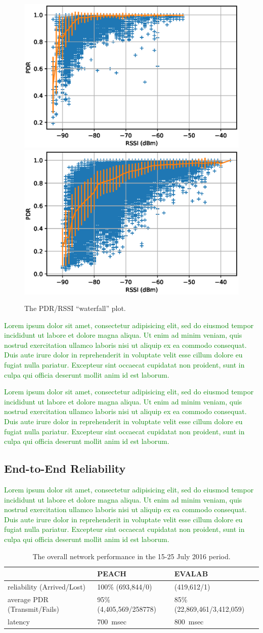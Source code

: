 \documentclass{elsarticle}
\newcommand{\lorem}          {\textcolor{green}{Lorem ipsum dolor sit amet, consectetur adipisicing elit, sed do eiusmod tempor incididunt ut labore et dolore magna aliqua. Ut enim ad minim veniam, quis nostrud exercitation ullamco laboris nisi ut aliquip ex ea commodo consequat. Duis aute irure dolor in reprehenderit in voluptate velit esse cillum dolore eu fugiat nulla pariatur. Excepteur sint occaecat cupidatat non proident, sunt in culpa qui officia deserunt mollit anim id est laborum.}}
\begin{document}
\begin{figure}
    \includegraphics[width=0.5\columnwidth]{waterfall_peach.eps}
    \includegraphics[width=0.5\columnwidth]{waterfall.eps}  
    \caption{
        The PDR/RSSI ``waterfall'' plot.
    }
    \label{fig:waterfall}
\end{figure}

\lorem


\lorem

\subsection{End-to-End Reliability}
\label{sec:net_reliability}


\lorem

\begin{table}
    \begin{tabular}{|l|l|l|}
        \hline
        {}	 							& PEACH 				  & EVALAB \\
        \hline
        reliability (Arrived/Lost) 		& 100\% (693,844/0) 	  & (419,612/1)\\ \hline
        average PDR (Transmit/Fails) 	& 95\% (4,405,569/258778) & 85\% (22,869,461/3,412,059)\\ \hline
        latency     					& 700~msec 				  & 800~msec\\
        \hline
    \end{tabular}
    \caption{The overall network performance in the 15-25 July 2016 period.}
    \label{tab:net_stats_peach}
\end{table}
\end{document}
